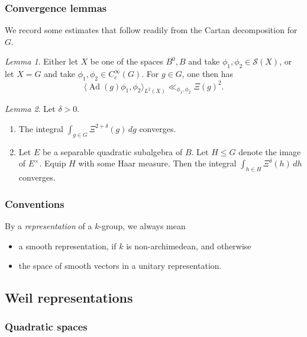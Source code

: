 \documentclass[reqno,10pt]{amsart}
\theoremstyle{plain} %
\theoremstyle{definition}
\theoremstyle{plain} %
\theoremstyle{remark}
\theoremstyle{itplain} %
\newtheorem{lemma}{Lemma}
\theoremstyle{remark} %
\renewcommand{\leq}{\leqslant}
\numberwithin{equation}{section}
\DeclareMathOperator{\Ad}{Ad}
\begin{document}
\subsubsection{Convergence
  lemmas\label{sec:local-convergence-lemmas}}
We record some estimates that follow readily from the Cartan decomposition for $G$.

\begin{lemma}\label{lemma:cheap-matrix-coeff-schwartz-space-B-estimate-via-Xi}
  Either let $X$ be one of the spaces $B^0, B$ and take $\phi_1, \phi_2 \in \mathcal{S}(X)$, or let $X = G$ and take $\phi_1,\phi_2 \in C_c^\infty(G)$.  For $g \in G$, one then has
  \[\langle \Ad(g) \phi_1, \phi_2 \rangle_{L^2(X)}
    \ll_{\phi_1,\phi_2} \Xi(g)^2.\]
\end{lemma}

\begin{lemma}\label{lemma:convergence-Xi-along-G-and-H}
  Let $\delta > 0$.
  \begin{enumerate}
  \item The integral $\int_{g \in G} \Xi^{2+\delta}(g) \,d g$ converges.
  \item Let $E$ be a separable quadratic subalgebra of $B$.  Let $H \leq G$ denote the image of $E^\times$.  Equip $H$ with some Haar measure.  Then the integral $\int_{h \in H} \Xi^\delta(h) \, d h$ converges.
  \end{enumerate}
\end{lemma}

\subsubsection{Conventions}\label{sec:35ac3e56e6}
By a \emph{representation} of a $k$-group, we always mean
\begin{itemize}
\item a smooth representation, if $k$ is non-archimedean, and otherwise
\item the space of smooth vectors in a unitary representation.
\end{itemize}




\subsection{Weil representations\label{sec:local-weil-reps}}
\label{sec-2-2}

\subsubsection{Quadratic spaces\label{sec:local-quadratic-spaces}}
\label{sec-2-2-1}
\end{document}
